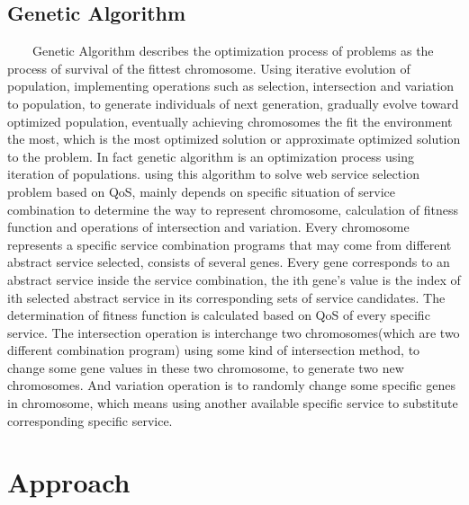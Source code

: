 \documentclass[senior,final,11pt]{iscs-thesis}
\begin{document}
\section{Genetic Algorithm}
~~~~Genetic Algorithm describes the optimization process of problems as the process of survival of the fittest chromosome.
Using iterative evolution of population, implementing operations such as selection, intersection and variation to population, to generate individuals of next generation, gradually evolve toward optimized population, eventually achieving chromosomes the fit the environment the most, which is the most optimized solution or approximate optimized solution to the problem.
In fact genetic algorithm is an optimization process using iteration of populations. \cite{14} using this algorithm to solve web service selection problem based on QoS, mainly depends on specific situation of service combination to determine the way to represent chromosome, calculation of fitness function and operations of intersection and variation. Every chromosome represents a specific service combination programs that may come from different abstract service selected, consists of several genes. Every gene corresponds to an abstract service inside the service combination, the ith gene’s value is the index of ith selected abstract service in its corresponding sets of service candidates. The determination of fitness function is calculated based on QoS of every specific service. The intersection operation is interchange two chromosomes(which are two different combination program) using some kind of intersection method, to change some gene values in these two chromosome, to generate two new chromosomes. And variation operation is to randomly change some specific genes in chromosome, which means using another available specific service to substitute corresponding specific service. 





\chapter{Approach}%
\end{document}
